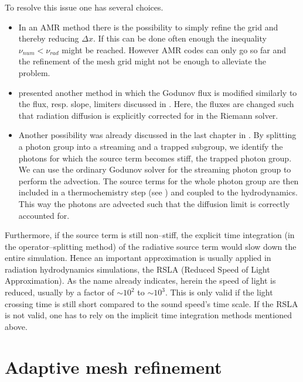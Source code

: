 To resolve this issue one has several choices.
\begin{itemize}
  \item In an AMR method there is the possibility to simply refine the grid and thereby reducing $\Delta x$.
  If this can be done often enough the inequality $\nu_{num} < \nu_{rad}$ might be reached.
  However AMR codes can only go so far and the refinement of the mesh grid might not be enough to alleviate the problem.
  \item \citet{Berthon_diff_flux} presented another method in which the Godunov flux is modified similarly to the flux, resp. slope, limiters discussed in .
  Here, the fluxes are changed such that radiation diffusion is explicitly corrected for in the Riemann solver.
  \item Another possibility was already discussed in the last chapter in .
  By splitting a photon group into a streaming and a trapped subgroup, we identify the photons for which the source term becomes stiff, the trapped photon group.
  We can use the ordinary Godunov solver for the streaming photon group to perform the advection.
  The source terms for the whole photon group are then included in a thermochemistry step (see ) and coupled to the hydrodynamics.
  This way the photons are advected such that the diffusion limit is correctly accounted for.
\end{itemize}

Furthermore, if the source term is still non--stiff, the explicit time integration (in the operator--splitting method) of the radiative source term would slow down the entire simulation.
Hence an important approximation is usually applied in radiation hydrodynamics simulations, the RSLA (Reduced Speed of Light Approximation).
As the name already indicates, herein the speed of light is reduced, usually by a factor of $\sim10^{2}$ to $\sim10^{3}$.
This is only valid if the light crossing time is still short compared to the sound speed's time scale.
If the RSLA is not valid, one has to rely on the implicit time integration methods mentioned above.


\section{Adaptive mesh refinement}
\label{sec:AMR}

